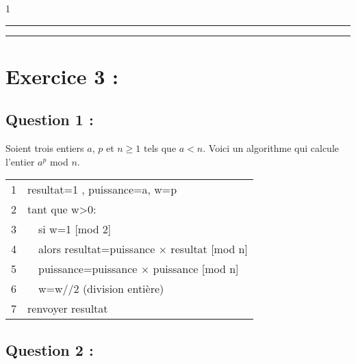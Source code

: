 1\documentclass[a4paper, 11pt,french]{article}
\begin{document}



\bigskip

\hrule\hrule

\bigskip

\section*{Exercice 3 :}

\subsection*{Question 1 :}
Soient trois entiers $a$, $p$ et $n \geqslant 1$ tels que $a < n$.
Voici un algorithme qui calcule l’entier $a^p$ mod $n$.


\begin{center}
  \begin{tabular}{|l|l|l|}
    \hline
    1& \multicolumn{2}{|l|}{resultat=1 , puissance=a, w=p}\\
    2& \multicolumn{2}{|l|}{tant que w>0:}\\
    3& & si w=1 [mod 2]\\
    4& & alors resultat=puissance $\times$ resultat [mod n]\\
    5& & puissance=puissance $\times$  puissance [mod n]\\
    6& & w=w//2 (division entière)\\
    7& \multicolumn{2}{|l|}{renvoyer resultat}\\\hline
  \end{tabular}
\end{center}

\subsection*{Question 2 :}
\end{document}
